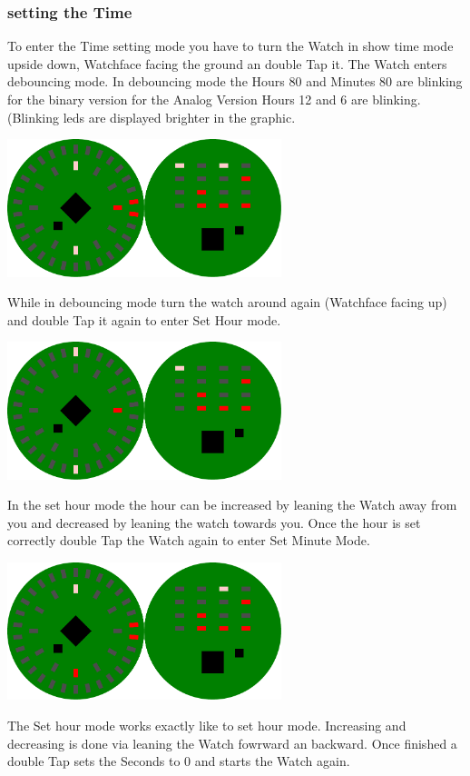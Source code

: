\subsubsection{setting the Time}
To enter the Time setting mode you have to turn the Watch in show time mode upside down, Watchface facing the ground an double Tap it. The Watch enters debouncing mode.
In debouncing mode the Hours 80 and Minutes 80 are blinking for the binary version for the Analog Version Hours 12 and 6 are blinking. (Blinking leds are displayed brighter in the graphic.
\begin{center}
\includegraphics[width=0.6\textwidth]{../Graphics/Time3_15_debouncing}
\end{center}
While in debouncing mode turn the watch around again (Watchface facing up)  and double Tap it again to enter Set Hour mode.
\begin{center}
\includegraphics[width=0.6\textwidth]{../Graphics/Time3_15_SetHour}
\end{center}
In the set hour mode the hour can be increased by leaning the Watch away from you and decreased by leaning the watch towards you.
Once the hour is set correctly double Tap the Watch again to enter Set Minute Mode.
\begin{center}
\includegraphics[width=0.6\textwidth]{../Graphics/Time3_15_SetMinute}
\end{center}
The Set hour mode works exactly like to set hour mode. Increasing and decreasing is done via leaning the Watch fowrward an backward. Once finished a double Tap sets the Seconds to 0 and starts the Watch again.
